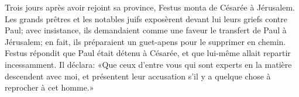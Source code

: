 Trois jours après avoir rejoint sa province,
	Festus monta de Césarée à Jérusalem.
Les grands prêtres et les notables juifs
	exposèrent devant lui leurs griefs contre Paul;
	avec insistance, ils demandaient comme une faveur
		le transfert de Paul à Jérusalem;
	en fait, ils préparaient un guet-apens pour le supprimer en chemin.
Festus répondit que Paul était détenu à Césarée,
	et que lui-même allait repartir incessamment.
Il déclara: «Que ceux d’entre vous qui sont experts en la matière
	descendent avec moi, et présentent leur accusation
	s’il y a quelque chose à reprocher à cet homme.»
